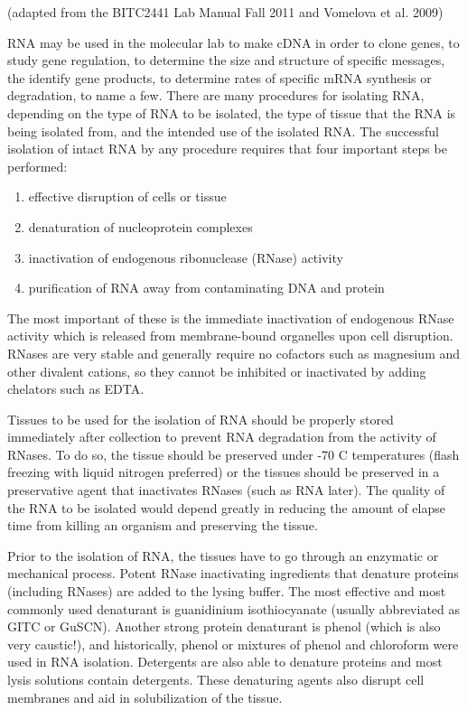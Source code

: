 \documentclass[11pt, oneside]{article}
\begin{document}
		(adapted from the BITC2441 Lab Manual Fall 2011 and Vomelova et al. 2009)

		\vspace{3mm}
		
		\noindent RNA may be used in the molecular lab to make cDNA in order to clone genes, to study gene regulation, to determine the size and 			structure of specific messages, the identify gene products, to determine rates of specific mRNA synthesis or degradation, to name a few. There are 		many procedures for isolating RNA, depending on the type of RNA to be isolated, the type of tissue that the RNA is being isolated from, and the 		intended use of the isolated RNA. The successful isolation of intact RNA by any procedure requires that four important steps be performed: 
		
		\begin{enumerate}
			\itemsep0mm
			\item effective disruption of cells or tissue 
			\item denaturation of nucleoprotein complexes 
			\item inactivation of endogenous ribonuclease (RNase) activity 
			\item purification of RNA away from contaminating DNA and protein 
		\end{enumerate}


		\noindent The most important of these is the immediate inactivation of endogenous RNase activity which is released from membrane-bound 			organelles upon cell disruption. RNases are very stable and generally require no cofactors such as magnesium and other divalent cations, so they 		cannot be 	inhibited or inactivated by adding chelators such as EDTA.
		
		\vspace{3mm}
		
		\noindent Tissues to be used for the isolation of RNA should be properly stored immediately after collection to prevent RNA degradation from the 		activity of RNases. To do so, the tissue should be preserved under -70 C temperatures (flash freezing with liquid nitrogen preferred) or the tissues 		should be 	preserved in a preservative agent that inactivates RNases (such as RNA later). The quality of the RNA to be isolated would depend 			greatly in reducing the amount of elapse time from killing an organism and preserving the tissue. 
		
		\vspace{3mm}

		\noindent Prior to the isolation of RNA, the tissues have to go through an enzymatic or mechanical process. Potent RNase inactivating ingredients 		that denature proteins (including RNases) are added to the lysing buffer. The most effective and most commonly used denaturant is guanidinium 		isothiocyanate (usually abbreviated as GITC or GuSCN). Another strong protein denaturant is phenol (which is also very caustic!), and historically, 		phenol or mixtures of phenol and chloroform were used in RNA isolation. Detergents are also able to denature proteins and most lysis solutions 		contain detergents. These denaturing agents also disrupt cell membranes and aid in solubilization of the tissue.
		
\end{document}
